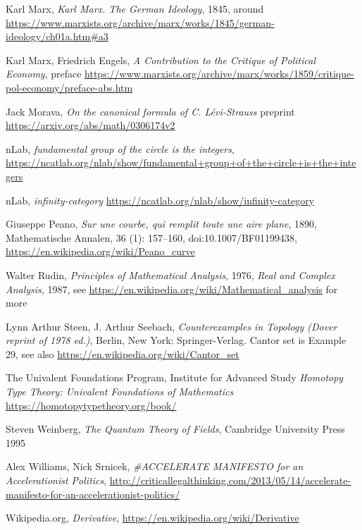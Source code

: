 \documentclass{article}
\begin{document}
\begin{thebibliography}{99}
 Karl Marx, \textit{Karl Marx. The German Ideology}, 1845, around \url{https://www.marxists.org/archive/marx/works/1845/german-ideology/ch01a.htm#a3}

 Karl Marx, Friedrich Engels, \textit{A Contribution to the Critique of Political Economy}, preface \url{https://www.marxists.org/archive/marx/works/1859/critique-pol-economy/preface-abs.htm}

 Jack Morava, \textit{On the canonical formula of C. L\'evi-Strauss} preprint \url{https://arxiv.org/abs/math/0306174v2}

 nLab, \textit{fundamental group of the circle is the integers}, \url{https://ncatlab.org/nlab/show/fundamental+group+of+the+circle+is+the+integers}

 nLab, \textit{infinity-category} \url{https://ncatlab.org/nlab/show/infinity-category}

 Giuseppe Peano, \textit{Sur une courbe, qui remplit toute une aire plane}, 1890, Mathematische Annalen, 36 (1): 157–160, doi:10.1007/BF01199438, \url{https://en.wikipedia.org/wiki/Peano_curve}

 Walter Rudin, \textit{Principles of Mathematical Analysis}, 1976, \textit{Real and Complex Analysis}, 1987, see \url{https://en.wikipedia.org/wiki/Mathematical_analysis} for more

 Lynn Arthur Steen, J. Arthur Seebach, \textit{Counterexamples in Topology (Dover reprint of 1978 ed.)}, Berlin, New York: Springer-Verlag. Cantor set is Example 29, see also \url{https://en.wikipedia.org/wiki/Cantor_set}


 The Univalent Foundations Program,
Institute for Advanced Study \textit{Homotopy Type Theory:
Univalent Foundations of Mathematics} \url{https://homotopytypetheory.org/book/}

 Steven Weinberg, \textit{The Quantum Theory of Fields}, Cambridge University Press 1995

 Alex Williams, Nick Srnicek, \textit{\#ACCELERATE MANIFESTO for an Accelerationist Politics}, \url{http://criticallegalthinking.com/2013/05/14/accelerate-manifesto-for-an-accelerationist-politics/}



 Wikipedia.org, \textit{Derivative}, \url{https://en.wikipedia.org/wiki/Derivative}

\end{thebibliography}
\end{document}

